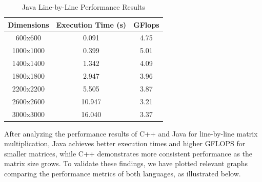 \documentclass{article}
\begin{document}
\begin{table}[H]
\centering
\caption{Java Line-by-Line Performance Results}
\begin{tabular}{||c | c | c||} 
 \hline
 \textbf{Dimensions} & \textbf{Execution Time (s)} & \textbf{GFlops} \\  
 \hline \hline
 600x600  & 0.091   & 4.75   \\  
 \hline
 1000x1000 & 0.399   & 5.01   \\  
 \hline
 1400x1400 & 1.342   & 4.09   \\  
 \hline
 1800x1800 & 2.947   & 3.96   \\  
 \hline
 2200x2200 & 5.505   & 3.87   \\  
 \hline
 2600x2600 & 10.947  & 3.21   \\  
 \hline
 3000x3000 & 16.040  & 3.37   \\  
 \hline
\end{tabular}
\end{table}

After analyzing the performance results of C++ and Java for line-by-line matrix multiplication, Java achieves better execution times and higher GFLOPS for smaller matrices, while C++ demonstrates more consistent performance as the matrix size grows. To validate these findings, we have plotted relevant graphs comparing the performance metrics of both languages, as illustrated below.
\end{document}
